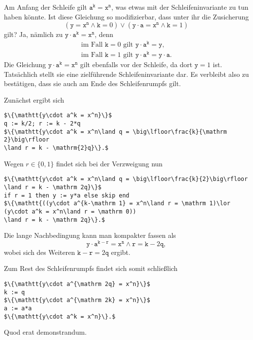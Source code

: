 \documentclass[8pt,fleqn,aspectratio=169]{beamer}
\newcommand{\parspace}{\vspace{0.8em}}
\begin{document}
\begin{frame}[fragile]
Am Anfang der Schleife gilt $\mathtt{a^k = x^n}$, was etwas mit der
Schleifeninvariante zu tun haben könnte. Ist diese Gleichung so
modifizierbar, dass unter ihr die Zusicherung
\[\mathtt{(y = x^n\land k = \mathrm 0)\lor (y\cdot a = x^n\land k = \mathrm 1)}\]
gilt?\pause{} Ja, nämlich zu $\mathtt{y\cdot a^k = x^n}$, denn
\begin{gather*}
\text{im Fall $\mathtt k=0$ gilt $\mathtt{y\cdot a^k = y}$},\\
\text{im Fall $\mathtt k=1$ gilt $\mathtt{y\cdot a^k = y\cdot a}$}.
\end{gather*}\pause
Die Gleichung $\mathtt{y\cdot a^k = x^n}$ gilt ebenfalls vor der
Schleife, da dort $\mathtt y = 1$ ist. Tatsächlich stellt sie eine
zielführende Schleifeninvariante dar. Es verbleibt also zu bestätigen,
dass sie auch am Ende des Schleifenrumpfs gilt.\pause

\parspace
Zunächst ergibt sich
\begin{lstlisting}[language=IMP, xleftmargin=\mathindent, mathescape]
$\{\mathtt{y\cdot a^k = x^n}\}$
q := k/2; r := k - 2*q
$\{\mathtt{y\cdot a^k = x^n\land q = \big\lfloor\frac{k}{\mathrm 2}\big\rfloor
\land r = k - \mathrm{2}q}\}.$
\end{lstlisting}
\end{frame}

\begin{frame}[fragile]
Wegen $r\in\{0,1\}$ findet sich bei der Verzweigung nun
\begin{lstlisting}[language=IMP, xleftmargin=\mathindent, mathescape]
$\{\mathtt{y\cdot a^k = x^n\land q = \big\lfloor\frac{k}{2}\big\rfloor
\land r = k - \mathrm 2q}\}$
if r = 1 then y := y*a else skip end
$\{\mathtt{((y\cdot a^{k-\mathrm 1} = x^n\land r = \mathrm 1)\lor
(y\cdot a^k = x^n\land r = \mathrm 0))
\land r = k - \mathrm 2q}\}.$
\end{lstlisting}\pause
Die lange Nachbedingung kann man kompakter fassen als
\[\mathtt{y\cdot a^{k - r} = x^n\land r = k - \mathrm 2q},\]
wobei sich des Weiteren $\mathtt{k - r = \mathrm 2q}$ ergibt.\pause

\parspace
Zum Rest des Schleifenrumpfs findet sich somit schließlich
\begin{lstlisting}[language=IMP, xleftmargin=\mathindent, mathescape]
$\{\mathtt{y\cdot a^{\mathrm 2q} = x^n}\}$
k := q
$\{\mathtt{y\cdot a^{\mathrm 2k} = x^n}\}$
a := a*a
$\{\mathtt{y\cdot a^k = x^n}\}.$
\end{lstlisting}
Quod erat demonstrandum.
\end{frame}
\end{document}
